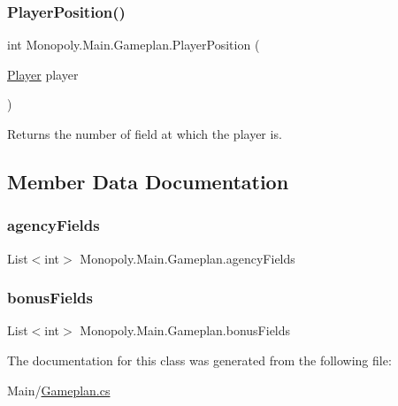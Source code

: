 \subsubsection{\texorpdfstring{Player\+Position()}{PlayerPosition()}}
{\footnotesize\ttfamily int Monopoly.\+Main.\+Gameplan.\+Player\+Position (\begin{DoxyParamCaption}\item[{\mbox{\hyperlink{class_monopoly_1_1_players_1_1_player}{Player}}}]{player }\end{DoxyParamCaption})\hspace{0.3cm}{\ttfamily [inline]}}

Returns the number of field at which the player is. 

\subsection{Member Data Documentation}
\mbox{\label{class_monopoly_1_1_main_1_1_gameplan_a279e1607bb8aeec59b6a4f9c5cd62d14}} 
\subsubsection{\texorpdfstring{agency\+Fields}{agencyFields}}
{\footnotesize\ttfamily List$<$int$>$ Monopoly.\+Main.\+Gameplan.\+agency\+Fields}

\mbox{\label{class_monopoly_1_1_main_1_1_gameplan_ab3cffaf5db7de9445f163017fc6280f2}} 
\subsubsection{\texorpdfstring{bonus\+Fields}{bonusFields}}
{\footnotesize\ttfamily List$<$int$>$ Monopoly.\+Main.\+Gameplan.\+bonus\+Fields}



The documentation for this class was generated from the following file\+:\begin{DoxyCompactItemize}
\item 
Main/\mbox{\hyperlink{_gameplan_8cs}{Gameplan.\+cs}}\end{DoxyCompactItemize}
